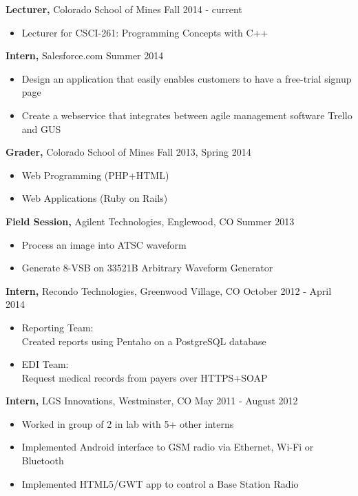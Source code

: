 \documentclass[12pt]{res}
\begin{document}
\begin{resume}
{\bf Lecturer,} Colorado School of Mines \hfill Fall 2014 - current
\begin{itemize} \itemsep -2pt
    \item Lecturer for CSCI-261: Programming Concepts with C++
\end{itemize}

{\bf Intern,} Salesforce.com \hfill Summer 2014
\begin{itemize} \itemsep -2pt
    \item Design an application that easily enables customers to have a free-trial signup page
    \item Create a webservice that integrates between agile management software Trello and GUS
\end{itemize}

{\bf Grader,} Colorado School of Mines \hfill Fall 2013, Spring 2014
\begin{itemize} \itemsep -2pt
    \item Web Programming (PHP+HTML)
    \item Web Applications (Ruby on Rails)
\end{itemize}

{\bf Field Session,} Agilent Technologies, Englewood, CO \hfill Summer 2013
\begin{itemize} \itemsep -2pt
    \item Process an image into ATSC waveform
    \item Generate 8-VSB on 33521B Arbitrary Waveform Generator
\end{itemize}

{\bf Intern,} Recondo Technologies, Greenwood Village, CO \hfill October 2012 - April 2014
\begin{itemize} \itemsep -2pt
    \item Reporting Team: \\
            Created reports using Pentaho on a PostgreSQL database
    \item EDI Team: \\
            Request medical records from payers over HTTPS+SOAP
\end{itemize}

{\bf Intern,} LGS Innovations, Westminster, CO \hfill May 2011 - August 2012
\begin{itemize} \itemsep -2pt
    \item Worked in group of 2 in lab with 5+ other interns
    \item Implemented Android interface to GSM radio via Ethernet, Wi-Fi or Bluetooth
    \item Implemented HTML5/GWT app to control a Base Station Radio
\end{itemize}


\end{resume}
\end{document}
